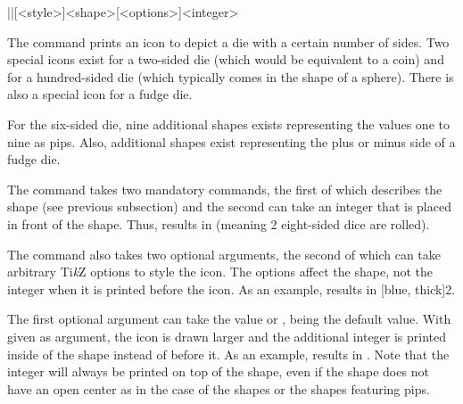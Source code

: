 \documentclass[a4paper]{article}
\begin{document}
\begin{macrodef}|\die|[<style>]{<shape>}[<options>]{<integer>}\end{macrodef}
The command \macro{\die} prints an icon to depict a die with a certain number of sides. Two special icons exist for a two-sided die (which would be equivalent to a coin) and for a hundred-sided die (which typically comes in the shape of a sphere). There is also a special icon for a fudge die. 

For the six-sided die, nine additional shapes exists representing the values one to nine as pips. Also, additional shapes exist representing the plus or minus side of a fudge die.

The command takes two mandatory commands, the first of which describes the shape (see previous subsection) and the second can take an integer that is placed in front of the shape. Thus,  results in  (meaning 2 eight-sided dice are rolled).

The command also takes two optional arguments, the second of which can take arbitrary Ti\emph{k}Z options to style the icon. The options affect the shape, not the integer when it is printed before the icon. As an example,  results in [blue, thick]{2}.

The first optional argument can take the value  or ,  being the default value. With  given as argument, the icon is drawn larger and the additional integer is printed inside of the shape instead of before it. As an example,  results in . Note that the integer will always be printed on top of the shape, even if the shape does not have an open center as in the case of the  shapes or the shapes featuring pips. 
\end{document}
